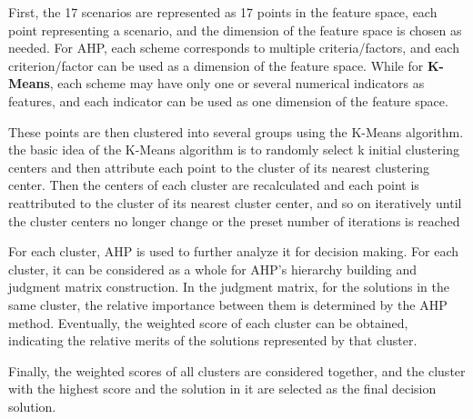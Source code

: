 First, the 17 scenarios are represented as 17 points in the feature space, each point representing a scenario, and the dimension of the feature space is chosen as needed. For AHP, each scheme corresponds to multiple criteria/factors, and each criterion/factor can be used as a dimension of the feature space. While for \textbf{K-Means}, each scheme may have only one or several numerical indicators as features, and each indicator can be used as one dimension of the feature space.

These points are then clustered into several groups using the K-Means algorithm. the basic idea of the K-Means algorithm is to randomly select k initial clustering centers and then attribute each point to the cluster of its nearest clustering center. Then the centers of each cluster are recalculated and each point is reattributed to the cluster of its nearest cluster center, and so on iteratively until the cluster centers no longer change or the preset number of iterations is reached


For each cluster, AHP is used to further analyze it for decision making. For each cluster, it can be considered as a whole for AHP's hierarchy building and judgment matrix construction. In the judgment matrix, for the solutions in the same cluster, the relative importance between them is determined by the AHP method. Eventually, the weighted score of each cluster can be obtained, indicating the relative merits of the solutions represented by that cluster.%

Finally, the weighted scores of all clusters are considered together, and the cluster with the highest score and the solution in it are selected as the final decision solution.%




